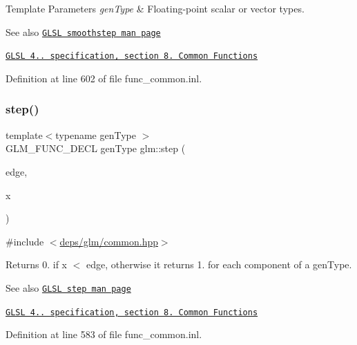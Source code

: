 \begin{DoxyTemplParams}{Template Parameters}
{\em gen\+Type} & Floating-\/point scalar or vector types.\\
\hline
\end{DoxyTemplParams}
\begin{DoxySeeAlso}{See also}
\href{http://www.opengl.org/sdk/docs/manglsl/xhtml/smoothstep.xml}{\tt G\+L\+SL smoothstep man page} 

\href{http://www.opengl.org/registry/doc/GLSLangSpec.4.20.8.pdf}{\tt G\+L\+SL 4.. specification, section 8. Common Functions} 
\end{DoxySeeAlso}


Definition at line 602 of file func\+\_\+common.\+inl.

\mbox{\label{group__core__func__common_ga015a1261ff23e12650211aa872863cce}} 
\subsubsection{\texorpdfstring{step()}{step()}\hspace{0.1cm}{\footnotesize\ttfamily [1/3]}}
{\footnotesize\ttfamily template$<$typename gen\+Type $>$ \\
G\+L\+M\+\_\+\+F\+U\+N\+C\+\_\+\+D\+E\+CL gen\+Type glm\+::step (\begin{DoxyParamCaption}\item[{gen\+Type}]{edge,  }\item[{gen\+Type}]{x }\end{DoxyParamCaption})}



{\ttfamily \#include $<$\hyperlink{common_8hpp}{deps/glm/common.\+hpp}$>$}

Returns 0. if x $<$ edge, otherwise it returns 1. for each component of a gen\+Type.

\begin{DoxySeeAlso}{See also}
\href{http://www.opengl.org/sdk/docs/manglsl/xhtml/step.xml}{\tt G\+L\+SL step man page} 

\href{http://www.opengl.org/registry/doc/GLSLangSpec.4.20.8.pdf}{\tt G\+L\+SL 4.. specification, section 8. Common Functions} 
\end{DoxySeeAlso}


Definition at line 583 of file func\+\_\+common.\+inl.



